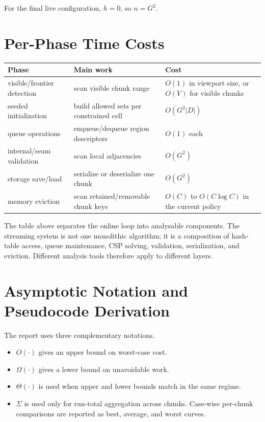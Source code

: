\documentclass[12pt,a4paper]{report}
\begin{document}
For the final live configuration, $h=0$, so $n = G^2$.

\section{Per-Phase Time Costs}
\begin{center}
\begin{tabular}{>{\raggedright\arraybackslash}p{3.0cm} >{\raggedright\arraybackslash}p{4.7cm} >{\raggedright\arraybackslash}p{3.5cm}}
\toprule
Phase & Main work & Cost \\
\midrule
visible/frontier detection & scan visible chunk range & $O(1)$ in viewport size, or $O(V)$ for visible chunks \\
seeded initialization & build allowed sets per constrained cell & $O(G^2 |D|)$ \\
queue operations & enqueue/dequeue region descriptors & $O(1)$ each \\
internal/seam validation & scan local adjacencies & $O(G^2)$ \\
storage save/load & serialize or deserialize one chunk & $O(G^2)$ \\
memory eviction & scan retained/removable chunk keys & $O(C)$ to $O(C \log C)$ in the current policy \\
\bottomrule
\end{tabular}
\end{center}

The table above separates the online loop into analysable components. The streaming system is not one monolithic algorithm; it is a composition of hash-table access, queue maintenance, CSP solving, validation, serialization, and eviction. Different analysis tools therefore apply to different layers.

\section{Asymptotic Notation and Pseudocode Derivation}
The report uses three complementary notations.

\begin{itemize}
\item \textbf{$O(\cdot)$} gives an upper bound on worst-case cost.
\item \textbf{$\Omega(\cdot)$} gives a lower bound on unavoidable work.
\item \textbf{$\Theta(\cdot)$} is used when upper and lower bounds match in the same regime.
\item \textbf{$\Sigma$} is used only for run-total aggregation across chunks.
Case-wise per-chunk comparisons are reported as best, average, and worst curves.
\end{itemize}
\end{document}
